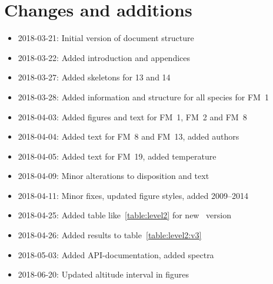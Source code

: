 \chapter{Changes and additions}
\label{ch:changes}

\begin{itemize}
    \item 2018-03-21: Initial version of document structure
    \item 2018-03-22: Added introduction and appendices
    \item 2018-03-27: Added skeletons for 13 and 14
    \item 2018-03-28: Added information and structure for all species for FM~1
    \item 2018-04-03: Added figures and text for FM~1, FM~2 and FM~8
    \item 2018-04-04: Added text for FM~8 and FM~13, added authors
    \item 2018-04-05: Added text for FM~19, added temperature
    \item 2018-04-09: Minor alterations to disposition and text
    \item 2018-04-11: Minor fixes, updated figure styles, added 2009--2014
    \item 2018-04-25: Added table like~\ref{table:level2} for new \smr~version
    \item 2018-04-26: Added results to table~\ref{table:level2:v3}
    \item 2018-05-03: Added API-documentation, added spectra
    \item 2018-06-20: Updated altitude interval in figures
\end{itemize}
